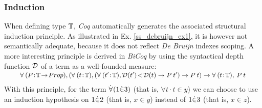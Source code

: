 \documentclass{llncs}
\begin{document}
\subsubsection{Induction} When defining type $\mathbb{T}$, \emph{Coq} automatically generates the 
associated structural induction principle. As illustrated in Ex. \ref{ss_debruijn_ex1}, it is 
however not semantically adequate, because it does not reflect \emph{De Bruijn} indexes 
scoping. A more interesting principle is derived in \emph{BiCoq} by using the syntactical 
depth function $\mathcal{D}$ of a term as a well-founded measure:
\[
\small
\begin{array}{l}
\vspace{-16pt}\\
\forall\:(P\!:\!\Btrm\!\to\!Prop),
(\forall\:(t\!:\!\Btrm),(\forall\:(t'\!:\!\Btrm),
                               \depth(t')\!<\!\depth(t) \to P\:t') \to P\:t) \to
\forall\:(t\!:\!\Btrm),\:P\:t
\end{array}
\]
With this principle, for the term $\dot{\forall}\:\!(\text{1}\dot{\in}\text{3})$ (that is,
$\forall t\!\cdot\!t\!\in\!y$) we can choose to use an induction hypothesis on 
$\text{1}\dot{\in}\text{2}$ (that is, $x\!\in\!y$) instead of $\text{1}\dot{\in}\text{3}$ (that is, 
$x\!\in\!z$).
\end{document}
